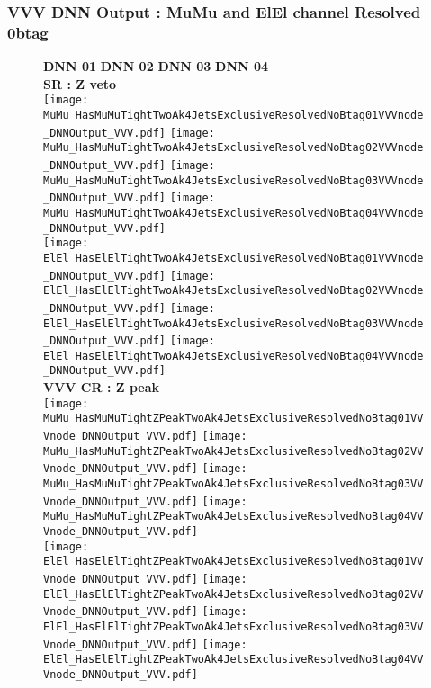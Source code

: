 \documentclass[9pt]{beamer}
\begin{document}
\begin{frame}
	\frametitle{VVV DNN Output : MuMu and ElEl channel Resolved 0btag}
	\begin{figure}
	    \textbf{DNN 01} \hspace{1.2cm} \textbf{DNN 02} \hspace{1.2cm} \textbf{DNN 03} \hspace{1.2cm} \textbf{DNN 04} \\
        \centering
        \textbf{SR : Z veto} \\
		\texttt{[image: MuMu\_HasMuMuTightTwoAk4JetsExclusiveResolvedNoBtag01VVVnode\_DNNOutput\_VVV.pdf]}
		\texttt{[image: MuMu\_HasMuMuTightTwoAk4JetsExclusiveResolvedNoBtag02VVVnode\_DNNOutput\_VVV.pdf]}
		\texttt{[image: MuMu\_HasMuMuTightTwoAk4JetsExclusiveResolvedNoBtag03VVVnode\_DNNOutput\_VVV.pdf]}
		\texttt{[image: MuMu\_HasMuMuTightTwoAk4JetsExclusiveResolvedNoBtag04VVVnode\_DNNOutput\_VVV.pdf]}\\
		\texttt{[image: ElEl\_HasElElTightTwoAk4JetsExclusiveResolvedNoBtag01VVVnode\_DNNOutput\_VVV.pdf]}
		\texttt{[image: ElEl\_HasElElTightTwoAk4JetsExclusiveResolvedNoBtag02VVVnode\_DNNOutput\_VVV.pdf]}
		\texttt{[image: ElEl\_HasElElTightTwoAk4JetsExclusiveResolvedNoBtag03VVVnode\_DNNOutput\_VVV.pdf]}
		\texttt{[image: ElEl\_HasElElTightTwoAk4JetsExclusiveResolvedNoBtag04VVVnode\_DNNOutput\_VVV.pdf]}\\
        \textbf{VVV CR : Z peak} \\
		\texttt{[image: MuMu\_HasMuMuTightZPeakTwoAk4JetsExclusiveResolvedNoBtag01VVVnode\_DNNOutput\_VVV.pdf]}
		\texttt{[image: MuMu\_HasMuMuTightZPeakTwoAk4JetsExclusiveResolvedNoBtag02VVVnode\_DNNOutput\_VVV.pdf]}
		\texttt{[image: MuMu\_HasMuMuTightZPeakTwoAk4JetsExclusiveResolvedNoBtag03VVVnode\_DNNOutput\_VVV.pdf]}
		\texttt{[image: MuMu\_HasMuMuTightZPeakTwoAk4JetsExclusiveResolvedNoBtag04VVVnode\_DNNOutput\_VVV.pdf]}\\
		\texttt{[image: ElEl\_HasElElTightZPeakTwoAk4JetsExclusiveResolvedNoBtag01VVVnode\_DNNOutput\_VVV.pdf]}
		\texttt{[image: ElEl\_HasElElTightZPeakTwoAk4JetsExclusiveResolvedNoBtag02VVVnode\_DNNOutput\_VVV.pdf]}
		\texttt{[image: ElEl\_HasElElTightZPeakTwoAk4JetsExclusiveResolvedNoBtag03VVVnode\_DNNOutput\_VVV.pdf]}
		\texttt{[image: ElEl\_HasElElTightZPeakTwoAk4JetsExclusiveResolvedNoBtag04VVVnode\_DNNOutput\_VVV.pdf]}\\
	\end{figure}
\end{frame}
\end{document}
